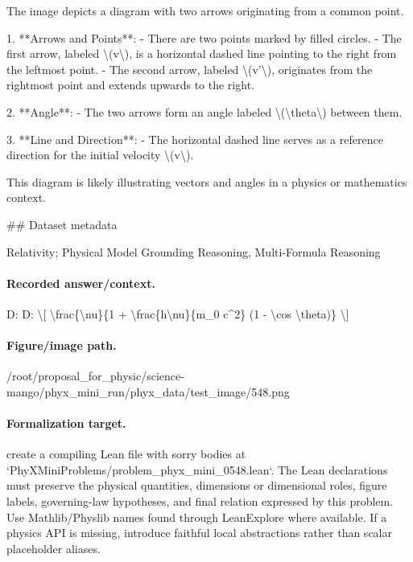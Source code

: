 The image depicts a diagram with two arrows originating from a common point. 

1. **Arrows and Points**:
   - There are two points marked by filled circles.
   - The first arrow, labeled \textbackslash{}(v\textbackslash{}), is a horizontal dashed line pointing to the right from the leftmost point.
   - The second arrow, labeled \textbackslash{}(v'\textbackslash{}), originates from the rightmost point and extends upwards to the right.

2. **Angle**:
   - The two arrows form an angle labeled \textbackslash{}(\textbackslash{}theta\textbackslash{}) between them.

3. **Line and Direction**:
   - The horizontal dashed line serves as a reference direction for the initial velocity \textbackslash{}(v\textbackslash{}).

This diagram is likely illustrating vectors and angles in a physics or mathematics context.

\#\# Dataset metadata

Relativity; Physical Model Grounding Reasoning, Multi-Formula Reasoning

\paragraph{Recorded answer/context.}
D: D: \textbackslash{}[  \textbackslash{}frac\{\textbackslash{}nu\}\{1 + \textbackslash{}frac\{h\textbackslash{}nu\}\{m\_0 c\textasciicircum{}2\} (1 - \textbackslash{}cos \textbackslash{}theta)\} \textbackslash{}]

\paragraph{Figure/image path.}
/root/proposal\_for\_physic/science-mango/phyx\_mini\_run/phyx\_data/test\_image/548.png

\paragraph{Formalization target.}
create a compiling Lean file with sorry bodies at `PhyXMiniProblems/problem\_phyx\_mini\_0548.lean`. The Lean declarations must preserve the physical quantities, dimensions or dimensional roles, figure labels, governing-law hypotheses, and final relation expressed by this problem.
Use Mathlib/Physlib names found through LeanExplore where available. If a physics API is missing, introduce faithful local abstractions rather than scalar placeholder aliases.


